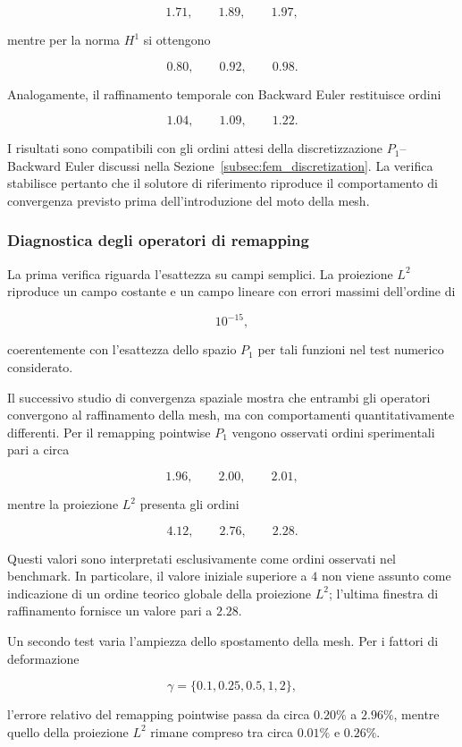 \[
1.71,\qquad1.89,\qquad1.97,
\]

mentre per la norma $H^1$ si ottengono

\[
0.80,\qquad0.92,\qquad0.98.
\]

Analogamente, il raffinamento temporale con Backward Euler restituisce ordini

\[
1.04,\qquad1.09,\qquad1.22.
\]

I risultati sono compatibili con gli ordini attesi della discretizzazione $P_1$--Backward Euler discussi nella Sezione~\ref{subsec:fem_discretization}. La verifica stabilisce pertanto che il solutore di riferimento riproduce il comportamento di convergenza previsto prima dell'introduzione del moto della mesh.

\subsubsection{Diagnostica degli operatori di remapping}

La prima verifica riguarda l'esattezza su campi semplici. La proiezione $L^2$ riproduce un campo costante e un campo lineare con errori massimi dell'ordine di

\[
10^{-15},
\]

coerentemente con l'esattezza dello spazio $P_1$ per tali funzioni nel test numerico considerato.

Il successivo studio di convergenza spaziale mostra che entrambi gli operatori convergono al raffinamento della mesh, ma con comportamenti quantitativamente differenti. Per il remapping pointwise $P_1$ vengono osservati ordini sperimentali pari a circa

\[
1.96,\qquad2.00,\qquad2.01,
\]

mentre la proiezione $L^2$ presenta gli ordini

\[
4.12,\qquad2.76,\qquad2.28.
\]

Questi valori sono interpretati esclusivamente come ordini osservati nel benchmark. In particolare, il valore iniziale superiore a $4$ non viene assunto come indicazione di un ordine teorico globale della proiezione $L^2$; l'ultima finestra di raffinamento fornisce un valore pari a $2.28$.

Un secondo test varia l'ampiezza dello spostamento della mesh. Per i fattori di deformazione

\[
\gamma=\{0.1,0.25,0.5,1,2\},
\]

l'errore relativo del remapping pointwise passa da circa $0.20\%$ a $2.96\%$, mentre quello della proiezione $L^2$ rimane compreso tra circa $0.01\%$ e $0.26\%$.

